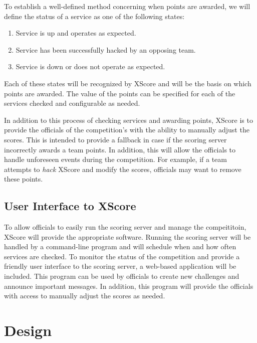 \documentclass[letterpaper,10pt,english]{manual}
\begin{document}
To establish a well-defined method concerning when points are awarded, we will
define the status of a service as one of the following states:
\begin{enumerate}
\item {} 
Service is up and operates as expected.

\item {} 
Service has been successfully hacked by an opposing team.

\item {} 
Service is down or does not operate as expected.

\end{enumerate}

Each of these states will be recognized by XScore and will be the basis on which
points are awarded.  The value of the points can be specified for each of the services
checked and configurable as needed.

In addition to this process of checking services and awarding points, XScore is to
provide the officials of the competition's with the ability to manually adjust
the scores.  This is intended to provide a fallback in case if the scoring server
incorrectly awards a team points.  In addition, this will allow the officials to
handle unforeseen events during the competition.  For example, if a team attempts to
\emph{hack} XScore and modify the scores, officials may want to remove these points.


\section{User Interface to XScore}

To allow officials to easily run the scoring server and manage the compeititoin,
XScore will provide the appropriate software.  Running the scoring server will
be handled by a command-line program and will schedule when and how often services
are checked.  To monitor the status of the competition and provide a friendly user
interface to the scoring server, a web-based application will be included.  This
program can be used by officials to create new challenges and announce important messages.
In addition, this program will provide the officials with access to manually adjust the
scores as needed.

\resetcurrentobjects
\hypertarget{--doc-Design}{}

\chapter{Design}
\end{document}
